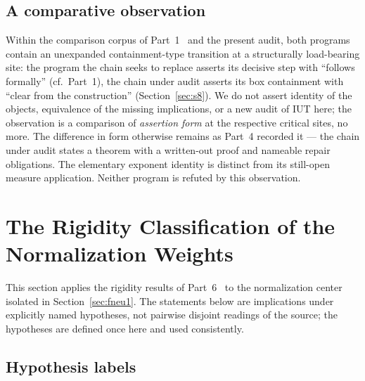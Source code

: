 \documentclass[11pt,a4paper]{article}
\theoremstyle{definition}
\theoremstyle{remark}
\begin{document}
\subsection{A comparative observation}\label{sec:symmetry}

Within the comparison corpus of Part~1~\cite{part1} and the present audit,
both programs contain an unexpanded containment-type transition at a
structurally load-bearing site: the program the chain seeks to replace
asserts its decisive step with ``follows formally''
(cf.~Part~1), the chain under audit asserts its box containment with
``clear from the construction'' (Section~\ref{sec:s8}). We do not assert
identity of the objects, equivalence of the missing implications, or a new
audit of IUT here; the observation is a comparison of \emph{assertion form}
at the respective critical sites, no more. The difference in form otherwise
remains as Part~4 recorded it --- the chain under audit states a theorem
with a written-out proof and nameable repair obligations. The elementary
exponent identity is distinct from its still-open measure application. Neither program is refuted by this observation.

\section{The Rigidity Classification of the Normalization Weights}\label{sec:case}

This section applies the rigidity results of Part~6~\cite{part6} to the
normalization center isolated in Section~\ref{sec:fneu1}. The statements
below are implications under explicitly named hypotheses, not pairwise
disjoint readings of the source; the hypotheses are defined once here and
used consistently.

\subsection{Hypothesis labels}\label{sec:hyplabels}
\end{document}
